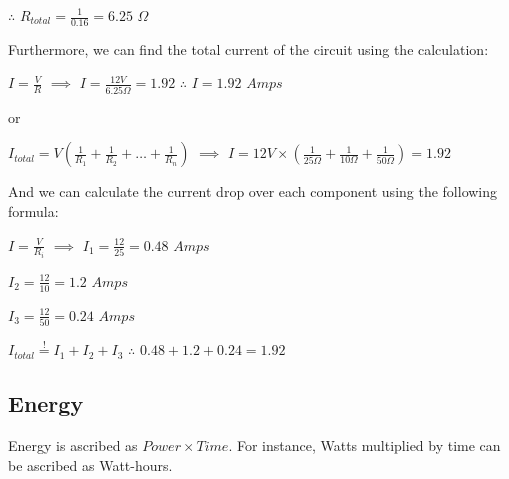 \documentclass[11pt,a4paper]{article}
\begin{document}
$\therefore$ $R_{total} = \frac{1}{0.16} = 6.25$ $\Omega$

Furthermore, we can find the total current of the circuit using the calculation:

$I = \frac{V}{R}$ $\implies$ $I = \frac{12V}{6.25 \Omega} = 1.92$ $\therefore$ $I = 1.92$ $Amps$

or

$I_{total} = V(\frac{1}{R_1} + \frac{1}{R_2} + \ldots + \frac{1}{R_n})$ $\implies$ $I = 12V\times (\frac{1}{25\Omega} + \frac{1}{10\Omega} + \frac{1}{50\Omega}) = 1.92$

And we can calculate the current drop over each component using the following formula:

$I = \frac{V}{R_i}$ $\implies$ $I_1 = \frac{12}{25} = 0.48$ $Amps$

$I_2 = \frac{12}{10} = 1.2$ $Amps$

$I_3 = \frac{12}{50} = 0.24$ $Amps$

$I_{total} \overset{!}{=} I_1 + I_2 + I_3$ $\therefore$ $0.48+1.2+0.24 = 1.92$
\subsection{Energy}
Energy is ascribed as $Power \times Time$. For instance, Watts multiplied by time can be ascribed as Watt-hours.
\end{document}
